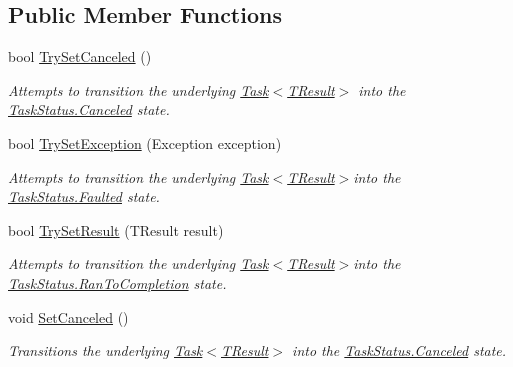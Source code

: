 \subsection*{Public Member Functions}
\begin{DoxyCompactItemize}
\item 
bool \hyperlink{class_system_1_1_threading_1_1_tasks_1_1_task_completion_source_a892fea1287343b8905bbe8b4fa0407af}{Try\+Set\+Canceled} ()
\begin{DoxyCompactList}\small\item\em Attempts to transition the underlying \hyperlink{class_system_1_1_threading_1_1_tasks_1_1_task}{Task$<$\+T\+Result$>$} into the \hyperlink{namespace_system_1_1_threading_1_1_tasks_a60ab70a6c84627853d6b1056f1edebcfa0e22fe7d45f8e5632a4abf369b24e29c}{Task\+Status.\+Canceled} state. \end{DoxyCompactList}\item 
bool \hyperlink{class_system_1_1_threading_1_1_tasks_1_1_task_completion_source_a1a154209ebd190f5e9d2bff149ed3a6b}{Try\+Set\+Exception} (Exception exception)
\begin{DoxyCompactList}\small\item\em Attempts to transition the underlying \hyperlink{class_system_1_1_threading_1_1_tasks_1_1_task}{Task$<$\+T\+Result$>$}into the \hyperlink{namespace_system_1_1_threading_1_1_tasks_a60ab70a6c84627853d6b1056f1edebcfa2b310d05c23325e2935ec87b25a60b8f}{Task\+Status.\+Faulted} state. \end{DoxyCompactList}\item 
bool \hyperlink{class_system_1_1_threading_1_1_tasks_1_1_task_completion_source_a72372c2eee59e4221bd2f7c856046aff}{Try\+Set\+Result} (T\+Result result)
\begin{DoxyCompactList}\small\item\em Attempts to transition the underlying \hyperlink{class_system_1_1_threading_1_1_tasks_1_1_task}{Task$<$\+T\+Result$>$}into the \hyperlink{namespace_system_1_1_threading_1_1_tasks_a60ab70a6c84627853d6b1056f1edebcfaafe3c20f08a3dd6c4cab23d979c8f1e9}{Task\+Status.\+Ran\+To\+Completion} state. \end{DoxyCompactList}\item 
void \hyperlink{class_system_1_1_threading_1_1_tasks_1_1_task_completion_source_a051f19b8e8e34b2a19169420d6f49855}{Set\+Canceled} ()
\begin{DoxyCompactList}\small\item\em Transitions the underlying \hyperlink{class_system_1_1_threading_1_1_tasks_1_1_task}{Task$<$\+T\+Result$>$} into the \hyperlink{namespace_system_1_1_threading_1_1_tasks_a60ab70a6c84627853d6b1056f1edebcfa0e22fe7d45f8e5632a4abf369b24e29c}{Task\+Status.\+Canceled} state. \end{DoxyCompactList}\item 

\end{DoxyCompactItemize}
